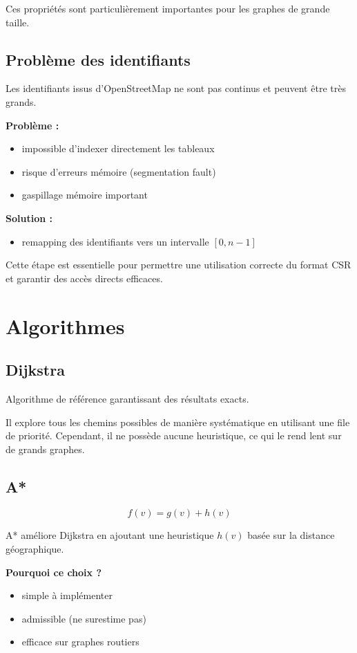 \documentclass[11pt]{article}
\begin{document}
Ces propriétés sont particulièrement importantes pour les graphes de grande taille.

\subsection{Problème des identifiants}

Les identifiants issus d’OpenStreetMap ne sont pas continus et peuvent être très grands.

\textbf{Problème :}
\begin{itemize}
\item impossible d’indexer directement les tableaux
\item risque d’erreurs mémoire (segmentation fault)
\item gaspillage mémoire important
\end{itemize}

\textbf{Solution :}
\begin{itemize}
\item remapping des identifiants vers un intervalle $[0, n-1]$
\end{itemize}

Cette étape est essentielle pour permettre une utilisation correcte du format CSR et garantir des accès directs efficaces.
\section{Algorithmes}

\subsection{Dijkstra}

Algorithme de référence garantissant des résultats exacts.

Il explore tous les chemins possibles de manière systématique en utilisant une file de priorité.  
Cependant, il ne possède aucune heuristique, ce qui le rend lent sur de grands graphes.

\subsection{A*}

\[
f(v)=g(v)+h(v)
\]

A* améliore Dijkstra en ajoutant une heuristique $h(v)$ basée sur la distance géographique.

\textbf{Pourquoi ce choix ?}
\begin{itemize}
\item simple à implémenter
\item admissible (ne surestime pas)
\item efficace sur graphes routiers
\end{itemize}
\end{document}
